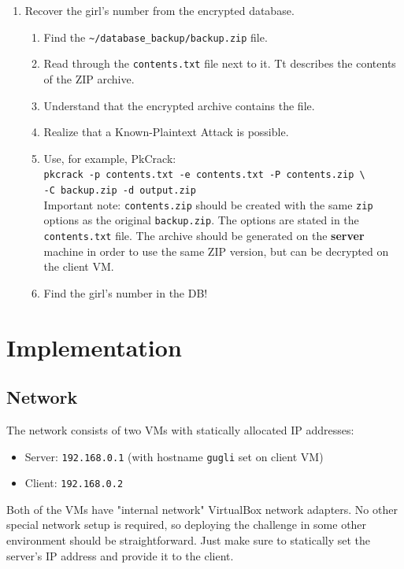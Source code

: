\documentclass[11pt, a4paper]{article}
\begin{document}
\begin{enumerate}
      \item Recover the girl's number from the encrypted database.
        \begin{enumerate}
          \item Find the \texttt{\textasciitilde/database\_backup/backup.zip} file.
          \item Read through the \texttt{contents.txt} file next to it.
            Tt describes the contents of the ZIP archive.
          \item Understand that the encrypted archive contains the file.
          \item Realize that a Known-Plaintext Attack is possible.
          \item Use, for example, PkCrack:\\
            \texttt{pkcrack -p contents.txt -e contents.txt -P contents.zip \textbackslash}\\
            \texttt{-C backup.zip -d output.zip}\\
            Important note: \texttt{contents.zip} should be created with the same \texttt{zip}
            options as the original \texttt{backup.zip}. The options are stated
            in the \texttt{contents.txt} file. The archive should be generated on the
            \textbf{server} machine in order to use the same ZIP version,
            but can be decrypted on the client VM.
          \item Find the girl's number in the DB!
        \end{enumerate}

\end{enumerate}


\section{Implementation}

\subsection{Network}
  The network consists of two VMs with statically allocated IP addresses:
  \begin{itemize}
    \item Server: \texttt{192.168.0.1} (with hostname \texttt{gugli} set on client VM)
    \item Client: \texttt{192.168.0.2}
  \end{itemize}
  Both of the VMs have "internal network" VirtualBox network adapters. No other
  special network setup is required, so deploying the challenge in some other
  environment should be straightforward. Just make sure to statically set the
  server's IP address and provide it to the client.
\end{document}
